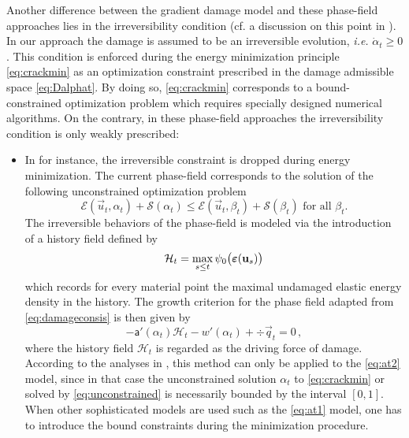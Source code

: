 Another difference between the gradient damage model and these phase-field approaches lies in the irreversibility condition (cf. a discussion on this point in \cite{AmorMarigoMaurini:2009}). In our approach the damage is assumed to be an irreversible evolution, \emph{i.e.} $\dot{\alpha}_t\geq 0$. This condition is enforced during the energy minimization principle \eqref{eq:crackmin} as an optimization constraint prescribed in the damage admissible space \eqref{eq:Dalphat}. By doing so, \eqref{eq:crackmin} corresponds to a bound-constrained optimization problem which requires specially designed numerical algorithms. On the contrary, in these phase-field approaches the irreversibility condition is only weakly prescribed:
\begin{itemize}
\item In \cite{MieheHofackerWelschinger:2010,MieheWelschingerHofacker:2010,BordenVerhooselScottHughesLandis:2012,KlinsmannRosatoKamlahMcMeeking:2015,MayVignolletBorst:2015} for instance, the irreversible constraint is dropped during energy minimization. The current phase-field corresponds to the solution of the following unconstrained optimization problem
\begin{equation} \label{eq:linearsystem}
\mathcal{E}(\vec{u}_t,\alpha_t)+\mathcal{S}(\alpha_t)\leq\mathcal{E}(\vec{u}_t,\beta_t)+\mathcal{S}(\beta_t)\text{ for all $\beta_t$}.
\end{equation}
The irreversible behaviors of the phase-field is modeled via the introduction of a history field defined by
\begin{equation} \label{eq:historyfield}
\mathcal{H}_t=\max_{s\leq t}\psi_0\bigl(\eps(\vec{u}_s)\bigr)
\end{equation}
which records for every material point the maximal undamaged elastic energy density in the history. The growth criterion for the phase field adapted from \eqref{eq:damageconsis} is then given by
\begin{equation} \label{eq:unconstrained}
-\mathsf{a}'(\alpha_t)\mathcal{H}_t-w'(\alpha_t)+\div\vec{q}_t=0\,,
\end{equation}
where the history field $\mathcal{H}_t$ is regarded as the driving force of damage. According to the analyses in \cite{Amor:2008}, this method can only be applied to the \eqref{eq:at2} model, since in that case the unconstrained solution $\alpha_t$ to \eqref{eq:crackmin} or solved by \eqref{eq:unconstrained} is necessarily bounded by the interval $[0,1]$. When other sophisticated models are used such as the \eqref{eq:at1} model, one has to introduce the bound constraints during the minimization procedure.


\end{itemize}
